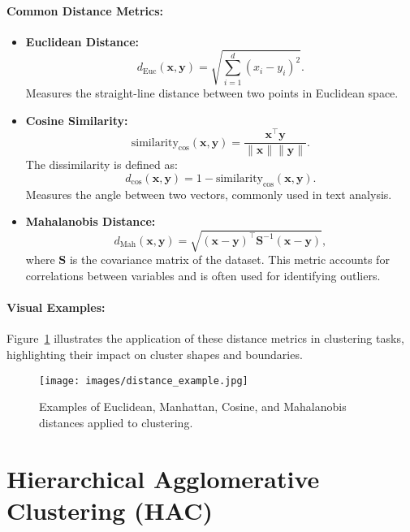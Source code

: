 \documentclass[12pt,a4paper]{article}
\begin{document}
\paragraph{Common Distance Metrics:}
\begin{itemize}
    \item \textbf{Euclidean Distance:}
    \[
    d_{\text{Euc}}(\mathbf{x}, \mathbf{y}) = \sqrt{\sum_{i=1}^d (x_i - y_i)^2}.
    \]
    Measures the straight-line distance between two points in Euclidean space.

    \item \textbf{Cosine Similarity:}
    \[
    \text{similarity}_{\text{cos}}(\mathbf{x}, \mathbf{y}) = \frac{\mathbf{x}^\top \mathbf{y}}{\|\mathbf{x}\| \|\mathbf{y}\|}.
    \]
    The dissimilarity is defined as:
    \[
    d_{\text{cos}}(\mathbf{x}, \mathbf{y}) = 1 - \text{similarity}_{\text{cos}}(\mathbf{x}, \mathbf{y}).
    \]
    Measures the angle between two vectors, commonly used in text analysis.

    \item \textbf{Mahalanobis Distance:}
    \[
    d_{\text{Mah}}(\mathbf{x}, \mathbf{y}) = \sqrt{(\mathbf{x} - \mathbf{y})^\top \mathbf{S}^{-1} (\mathbf{x} - \mathbf{y})},
    \]
    where $\mathbf{S}$ is the covariance matrix of the dataset. This metric accounts for correlations between variables and is often used for identifying outliers.
\end{itemize}

\paragraph{Visual Examples:}
Figure~\ref{fig:distance_examples} illustrates the application of these distance metrics in clustering tasks, highlighting their impact on cluster shapes and boundaries.

\begin{figure}[h!]
\centering
\texttt{[image: images/distance\_example.jpg]}
\caption{Examples of Euclidean, Manhattan, Cosine, and Mahalanobis distances applied to clustering.}
\label{fig:distance_examples}
\end{figure}



\section{Hierarchical Agglomerative Clustering (HAC)}
\end{document}
